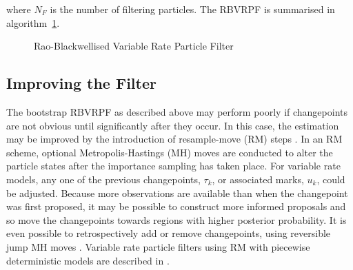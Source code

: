 \documentclass[journal]{IEEEtran}
\begin{document}
where $N_F$ is the number of filtering particles. The RBVRPF is summarised in algorithm~\ref{alg:RBVRPF}.

\begin{figure}
\label{alg:RBVRPF}
\caption{Rao-Blackwellised Variable Rate Particle Filter}
\end{figure}



\subsection{Improving the Filter}

The bootstrap RBVRPF as described above may perform poorly if changepoints are not obvious until significantly after they occur. In this case, the estimation may be improved by the introduction of resample-move (RM) steps \cite{Gilks2001}. In an RM scheme, optional Metropolis-Hastings (MH) moves are conducted to alter the particle states after the importance sampling has taken place. For variable rate models, any one of the previous changepoints, $\tau_k$, or associated marks, $u_k$, could be adjusted. Because more observations are available than when the changepoint was first proposed, it may be possible to construct more informed proposals and so move the changepoints towards regions with higher posterior probability. It is even possible to retrospectively add or remove changepoints, using reversible jump MH moves \cite{Green1995}. Variable rate particle filters using RM with piecewise deterministic models are described in \cite{Whiteley2011,Gilholm2008}.
\end{document}
